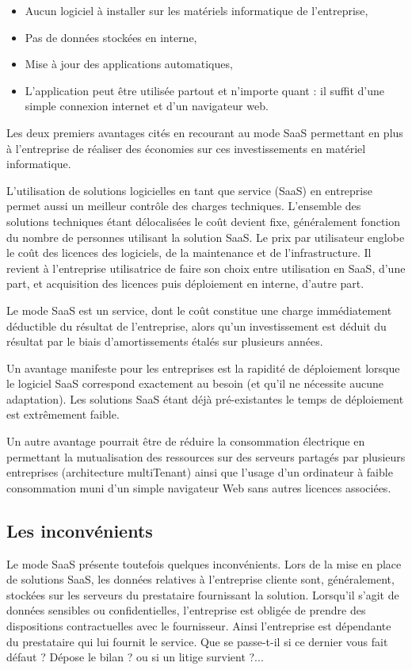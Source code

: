 \begin{itemize}
	\item Aucun logiciel à installer sur les matériels informatique de l'entreprise,
	\item Pas de données stockées en interne,
	\item Mise à jour des applications automatiques,
	\item L'application peut être utilisée partout et n'importe quant : il suffit d'une simple connexion internet et d'un navigateur web.
\end{itemize}
\medskip

Les deux premiers avantages cités en recourant au mode SaaS permettant en plus à l'entreprise de réaliser des économies sur ces investissements en matériel informatique.
\medskip

L'utilisation de solutions logicielles en tant que service (SaaS) en entreprise permet aussi un meilleur contrôle des charges techniques. L'ensemble des solutions techniques étant délocalisées le coût devient fixe, généralement fonction du nombre de personnes utilisant la solution SaaS. Le prix par utilisateur englobe le coût des licences des logiciels, de la maintenance et de l'infrastructure. Il revient à l'entreprise utilisatrice de faire son choix entre utilisation en SaaS, d'une part, et acquisition des licences puis déploiement en interne, d'autre part.
\medskip

Le mode SaaS est un service, dont le coût constitue une charge immédiatement déductible du résultat de l'entreprise, alors qu'un investissement est déduit du résultat par le biais d'amortissements étalés sur plusieurs années.
\medskip

Un avantage manifeste pour les entreprises est la rapidité de déploiement lorsque le logiciel SaaS correspond exactement au besoin (et qu'il ne nécessite aucune adaptation). Les solutions SaaS étant déjà pré-existantes le temps de déploiement est extrêmement faible.
\medskip

Un autre avantage pourrait être de réduire la consommation électrique en permettant la mutualisation des ressources sur des serveurs partagés par plusieurs entreprises (architecture \gls{multiTenant}) ainsi que l'usage d'un ordinateur à faible consommation muni d'un simple navigateur Web sans autres licences associées.

\subsection{Les inconvénients}
Le mode SaaS présente toutefois quelques inconvénients. Lors de la mise en place de solutions SaaS, les données relatives à l'entreprise cliente sont, généralement, stockées sur les serveurs du prestataire fournissant la solution. Lorsqu'il s'agit de données sensibles ou confidentielles, l'entreprise est obligée de prendre des dispositions contractuelles avec le fournisseur. Ainsi l'entreprise est dépendante du prestataire qui lui fournit le service. Que se passe-t-il si ce dernier vous fait défaut ? Dépose le bilan ? ou si un litige survient ?...
\medskip

